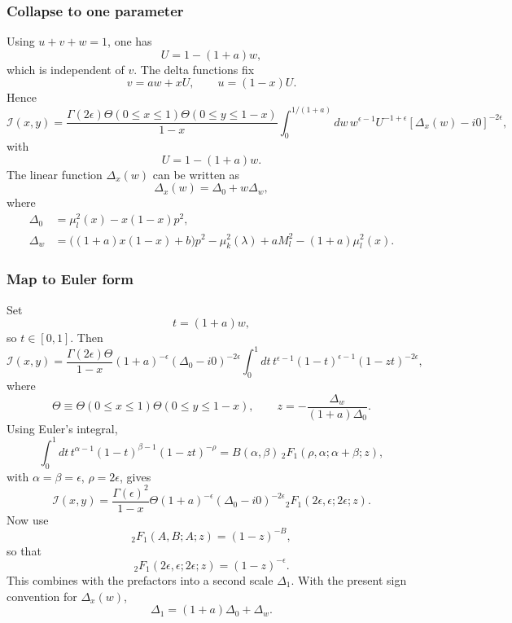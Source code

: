 \documentclass[11pt]{article}
\begin{document}
\subsubsection{Collapse to one parameter}
Using $u+v+w=1$, one has
\[
U=1-(1+a)w,
\]
which is independent of $v$. The delta functions fix
\[
v=aw+xU,\qquad u=(1-x)U.
\]
Hence
\begin{equation}
\mathcal I(x,y)=
\frac{\Gamma(2\epsilon)\Theta(0\le x\le1)\Theta(0\le y\le1-x)}{1-x}
\int_0^{1/(1+a)}dw\,w^{\epsilon-1}U^{-1+\epsilon}[\Delta_x(w)-i0]^{-2\epsilon},
\label{eq:method1-w-integral-before-euler}
\end{equation}
with
\[
U=1-(1+a)w.
\]
The linear function $\Delta_x(w)$ can be written as
\begin{equation}
\Delta_x(w)=\Delta_0+w\Delta_w,
\label{eq:method1-Delta-x-def}
\end{equation}
where
\begin{align}
\Delta_0 &= \mu_l^2(x)-x(1-x)p^2,\\
\Delta_w &= \bigl((1+a)x(1-x)+b\bigr)p^2
-\mu_k^2(\lambda)+aM_l^2-(1+a)\mu_l^2(x).
\label{eq:method1-Delta0-Deltaw-def}
\end{align}

\subsubsection{Map to Euler form}
Set
\begin{equation}
t=(1+a)w,
\label{eq:method1-euler-map}
\end{equation}
so $t\in[0,1]$. Then
\begin{equation}
\mathcal I(x,y)=
\frac{\Gamma(2\epsilon)\Theta}{1-x}(1+a)^{-\epsilon}(\Delta_0-i0)^{-2\epsilon}
\int_0^1dt\,t^{\epsilon-1}(1-t)^{\epsilon-1}(1-zt)^{-2\epsilon},
\end{equation}
where
\begin{equation}
\Theta\equiv \Theta(0\le x\le1)\Theta(0\le y\le1-x),
\qquad
z=-\frac{\Delta_w}{(1+a)\Delta_0}.
\label{eq:method1-theta-z-def}
\end{equation}
Using Euler's integral,
\[
\int_0^1dt\,t^{\alpha-1}(1-t)^{\beta-1}(1-zt)^{-\rho}
=B(\alpha,\beta)\,{}_2F_1(\rho,\alpha;\alpha+\beta;z),
\]
with $\alpha=\beta=\epsilon$, $\rho=2\epsilon$, gives
\begin{equation}
\mathcal I(x,y)=
\frac{\Gamma(\epsilon)^2}{1-x}\Theta
(1+a)^{-\epsilon}(\Delta_0-i0)^{-2\epsilon}
{}_2F_1(2\epsilon,\epsilon;2\epsilon;z).
\label{eq:method1-hypergeometric-form}
\end{equation}
Now use
\[
{}_2F_1(A,B;A;z)=(1-z)^{-B},
\]
so that
\[
{}_2F_1(2\epsilon,\epsilon;2\epsilon;z)=(1-z)^{-\epsilon}.
\]
This combines with the prefactors into a second scale $\Delta_1$.  With the present sign convention for $\Delta_x(w)$,
\begin{equation}
\Delta_1=(1+a)\Delta_0+\Delta_w.
\label{eq:method1-Delta1-from-Deltaw}
\end{equation}
\end{document}
